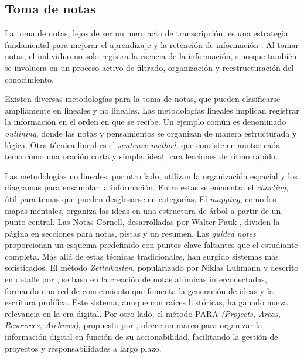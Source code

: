 \subsection{Toma de notas}
La toma de notas, lejos de ser un mero acto de transcripción, es una estrategia fundamental para mejorar el aprendizaje y la retención de información \parencite{jansenIntegrativeReviewCognitive2017}. Al tomar notas, el individuo no solo registra la esencia de la información, sino que también se involucra en un proceso activo de filtrado, organización y reestructuración del conocimiento.

Existen diversas metodologías para la toma de notas, que pueden clasificarse ampliamente en lineales y no lineales.
Las metodologías lineales implican registrar la información en el orden en que se recibe. Un ejemplo común es denominado \textit{outlining}, donde las notas y pensamientos se organizan de manera estructurada y lógica. Otra técnica lineal es el \textit{sentence method}, que consiste en anotar cada tema como una oración corta y simple, ideal para lecciones de ritmo rápido.

Las metodologías no lineales, por otro lado, utilizan la organización espacial y los diagramas para ensamblar la información. Entre estas se encuentra el \textit{charting}, útil para temas que pueden desglosarse en categorías. El \textit{mapping}, como los mapas mentales, organiza las ideas en una estructura de árbol a partir de un punto central. Las Notas Cornell, desarrolladas por Walter Pauk \parencite{paukHowStudyCollege2010}, dividen la página en secciones para notas, pistas y un resumen. Las \textit{guided notes} proporcionan un esquema predefinido con puntos clave faltantes que el estudiante completa.
Más allá de estas técnicas tradicionales, han surgido sistemas más sofisticados. El método \textit{Zettelkasten}, popularizado por Niklas Luhmann y descrito en detalle por \cite{ahrensHowTakeSmart2017}, se basa en la creación de notas atómicas interconectadas, formando una red de conocimiento que fomenta la generación de ideas y la escritura prolífica. Este sistema, aunque con raíces históricas, ha ganado nueva relevancia en la era digital. Por otro lado, el método PARA \textit{(Projects, Areas, Resources, Archives)}, propuesto por \cite{forteBuildingSecondBrain2022}, ofrece un marco para organizar la información digital en función de su accionabilidad, facilitando la gestión de proyectos y responsabilidades a largo plazo.


